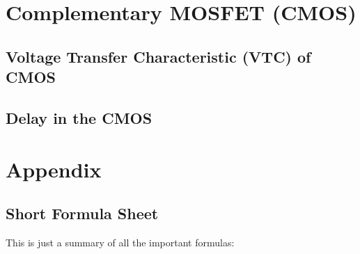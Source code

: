 \documentclass[12pt,letterpaper]{article} \usepackage{amsmath} \usepackage{graphicx} \usepackage[margin=1in]{geometry} \usepackage{longtable}  \usepackage{amssymb}
\begin{document}
	\section{Complementary MOSFET (CMOS)}
	
	\subsection{Voltage Transfer Characteristic (VTC) of CMOS}
	
	\subsection{Delay in the CMOS}
	
	\newpage
	\section{Appendix}
	\subsection{Short Formula Sheet}
	This is just a summary of all the important formulas:
	
\end{document}
